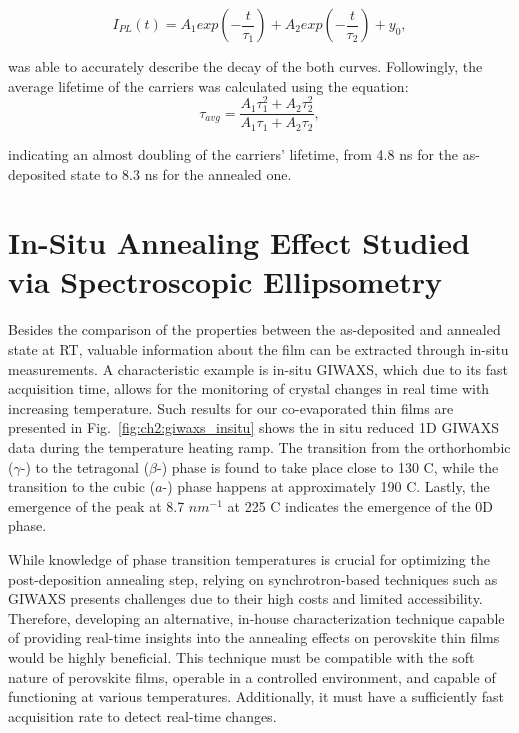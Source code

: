 \begin{equation}
    I_{PL}(t) = A_1exp(-\frac{t}{\tau_1}) + A_2exp(-\frac{t}{\tau_2}) + y_0,
\end{equation}

was able to accurately describe the decay of the both curves. Followingly, the average lifetime of the carriers was calculated using the equation: 
\begin{equation}
    \tau_{avg} = \frac{A_1 \tau_1^2 + A_2 \tau_2^2}{A_1 \tau_1 + A_2 \tau_2},
\end{equation}

indicating an almost doubling of the carriers' lifetime, from 4.8 ns for the as-deposited state to 8.3 ns for the annealed one.



\section{In-Situ Annealing Effect Studied via Spectroscopic Ellipsometry} \label{sec:in_situ}

Besides the comparison of the properties between the as-deposited and annealed state at RT, valuable information about the film can be extracted through in-situ measurements. A characteristic example is in-situ GIWAXS, which due to its fast acquisition time, allows for the monitoring of crystal changes in real time with increasing temperature. Such results for our co-evaporated  thin films are presented in Fig.~\ref{fig:ch2:giwaxs_insitu} shows the in situ reduced 1D GIWAXS data during the temperature heating ramp. The transition from the orthorhombic ($\gamma$-) to the tetragonal ($\beta$-) phase is found to take place close to 130 \degree C, while the transition to the cubic ($a$-) phase happens at approximately 190 \degree C. Lastly, the emergence of the peak at 8.7 $nm^{-1}$ at 225 \degree C indicates the emergence of the 0D  phase. 


While knowledge of phase transition temperatures is crucial for optimizing the post-deposition annealing step, relying on synchrotron-based techniques such as GIWAXS presents challenges due to their high costs and limited accessibility. Therefore, developing an alternative, in-house characterization technique capable of providing real-time insights into the annealing effects on perovskite thin films would be highly beneficial. This technique must be compatible with the soft nature of perovskite films, operable in a controlled environment, and capable of functioning at various temperatures. Additionally, it must have a sufficiently fast acquisition rate to detect real-time changes.

